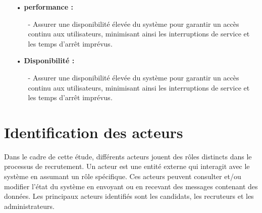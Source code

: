 \begin{itemize}
    \item[•] \textbf{performance :}
    \begin{itemize}
        \setlength{\itemsep}{0.2cm}
        \item[-] Assurer une disponibilité élevée du système pour garantir un accès continu aux utilisateurs, minimisant ainsi les interruptions de service et les temps d'arrêt imprévus.
    \end{itemize}
    \item[•] \textbf{Disponibilité :}
    \begin{itemize}
        \setlength{\itemsep}{0.2cm}
        \item[-] Assurer une disponibilité élevée du système pour garantir un accès continu aux utilisateurs, minimisant ainsi les interruptions de service et les temps d'arrêt imprévus.
    \end{itemize}
\end{itemize}

\section{Identification des acteurs}


Dans le cadre de cette étude, différents acteurs jouent des rôles 
distincts dans le processus de recrutement. Un acteur est une entité 
externe qui interagit avec le système en assumant un rôle spécifique. 
Ces acteurs peuvent consulter et/ou modifier l'état du système en 
envoyant ou en recevant des messages contenant des données. Les principaux 
acteurs identifiés sont les candidats, les recruteurs et les 
administrateurs.
\newline



